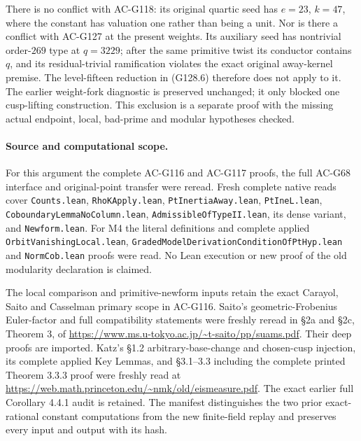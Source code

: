 There is no conflict with AC-G118: its original quartic
seed has \(e=23\), \(k=47\), where the constant has valuation
one rather than being a unit.  Nor is there a conflict with
AC-G127 at the present weights.  Its auxiliary seed has
nontrivial order-\(269\) type at \(q=3229\); after the same
primitive twist its conductor contains \(q\), and its
residual-trivial ramification violates the exact original
away-kernel premise.  The level-fifteen reduction in
(G128.6) therefore does not apply to it.
The earlier weight-fork diagnostic is preserved unchanged;
it only blocked one cusp-lifting construction.  This
exclusion is a separate proof with the missing actual
endpoint, local, bad-prime and modular hypotheses checked.

\paragraph{Source and computational scope.}
For this argument the complete AC-G116 and AC-G117 proofs,
the full AC-G68 interface and original-point transfer were
reread.  Fresh complete native reads cover
\texttt{Counts.lean}, \texttt{RhoKApply.lean},
\texttt{PtInertiaAway.lean}, \texttt{PtIneL.lean},
\texttt{CoboundaryLemmaNoColumn.lean},
\texttt{AdmissibleOfTypeII.lean}, its dense variant, and
\texttt{Newform.lean}.  For M4 the literal definitions and
complete applied \texttt{OrbitVanishingLocal.lean},
\texttt{GradedModelDerivationConditionOfPtHyp.lean} and
\texttt{NormCob.lean} proofs were read.  No Lean execution
or new proof of the old modularity declaration is claimed.

The local comparison and primitive-newform inputs retain
the exact Carayol, Saito and Casselman primary scope in
AC-G116.  Saito's geometric-Frobenius Euler-factor and
full compatibility statements were freshly reread in
\S2a and \S2c, Theorem 3, of
\url{https://www.ms.u-tokyo.ac.jp/~t-saito/pp/suams.pdf}.
Their deep proofs are imported.
Katz's \S1.2 arbitrary-base-change and chosen-cusp
injection, its complete applied Key Lemmas, and
\S3.1--3.3 including the complete printed Theorem 3.3.3
proof were freshly read at
\url{https://web.math.princeton.edu/~nmk/old/eismeasure.pdf}.
The exact earlier full Corollary 4.4.1 audit is retained.
The manifest distinguishes the two prior exact-rational
constant computations from the new finite-field replay
and preserves every input and output with its hash.
